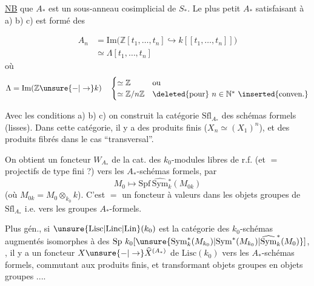 \uline{NB}   que $A_*$ est un sous-anneau cosimplicial de $S_*$. Le plus petit $A_*$ satisfaisant à a) b) c) est formé des

\[
\begin{aligned}
 A_n&=\mathrm{Im}\bigl(\mathbb Z[t_1,\ldots,t_n]\hookrightarrow k[[t_1,\ldots,t_n]]\bigr)\\
 &\simeq\Lambda[t_1,\ldots,t_n]
\end{aligned}
\]
où
\[
 \Lambda=\mathrm{Im}(\mathbb Z\unsure{-|\to} k)\quad
 \begin{cases}\simeq\mathbb Z&\text{ou}\\
 \simeq\mathbb Z/n\mathbb Z&\text{\deleted{pour} } n\in\mathbb N^*\ \text{\inserted{conven.}}\end{cases}
\]

Avec les conditions a) b) c) on construit la catégorie  $\mathrm{Sfl}_{A_*}$ des schémas formels (lisses). Dans cette catégorie, il y a des produits finis ($X_n\simeq(X_1)^n$), et des produits fibrés dans le cas ``transversal''.


 On obtient un foncteur $W_{A_*}$ de la cat. des $k_0$-modules libres de r.f. (et $=$ projectifs de type fini ?) vers les $A_*$-schémas formels, par
\[
 M_0\mapsto\mathrm{Spf}\,\widehat{\mathrm{Sym}}{}_k^*(M_{0k})
\]
(où $M_{0k}=M_0\otimes_{k_0}k$). C'est $=$ un foncteur à valeurs dans les objets groupes de $\mathrm{Sfl}_{A_*}$ i.e. vers les groupes $A_*$-formels.




Plus gén., si $\unsure{\mathrm{Lisc}|\mathrm{Linc}|\mathrm{Lin}}(k_0)$ est la catégorie des $k_0$-schémas augmentés isomorphes à  des  $\mathrm{Sp}\ k_0[\unsure{\mathrm{Sym}_k^*(M_{k_0})|\mathrm{Sym}^*(M_{k_0})|\widehat{\mathrm{Sym}}_k^*(M_0)}]$, , il y a un foncteur $X\unsure{-|\to}\widehat X^{(A_*)}$ de $\mathrm{Lisc}(k_0)$ vers les $A_*$-schémas formels, commutant aux produits finis, et transformant objets groupes en objets groupes ....
